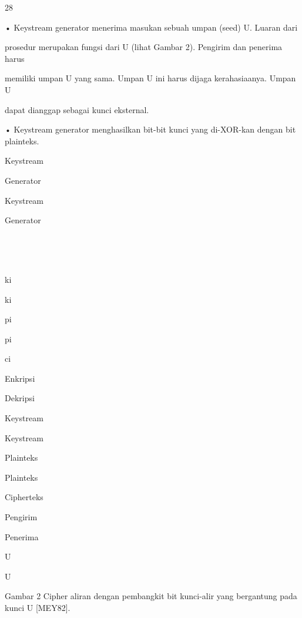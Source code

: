 \documentclass{article}
\begin{document}

28

• Keystream generator menerima masukan sebuah umpan (seed) U. Luaran dari 

prosedur merupakan fungsi dari U (lihat Gambar 2).  Pengirim dan penerima harus 

memiliki umpan U yang sama. Umpan  U ini harus dijaga kerahasiaanya.  Umpan U 

dapat dianggap sebagai kunci eksternal. 

• Keystream generator  menghasilkan bit-bit kunci yang di-XOR-kan dengan bit plainteks. 

Keystream

Generator

Keystream

Generator





ki

ki

pi

pi

ci

Enkripsi

Dekripsi

Keystream

Keystream

Plainteks

Plainteks

Cipherteks

Pengirim

Penerima

U

U

Gambar 2 Cipher aliran dengan pembangkit bit kunci-alir yang bergantung pada kunci U  [MEY82].
\end{document}
